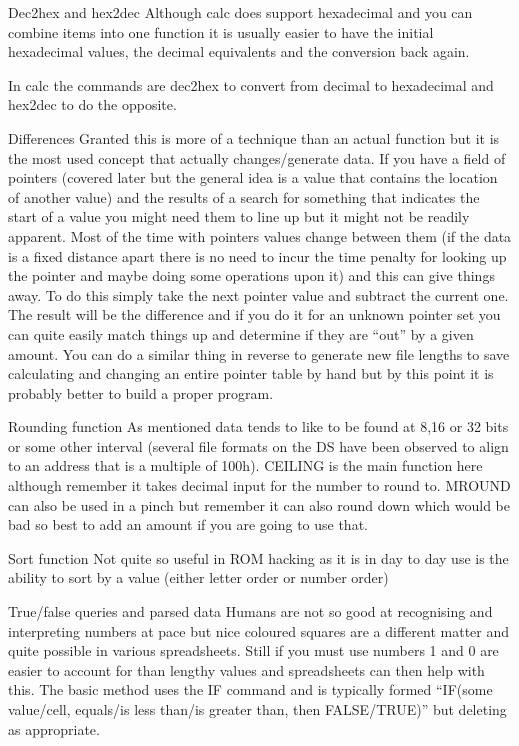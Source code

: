 \documentclass[
]{book}
\begin{document}
Dec2hex and hex2dec Although calc does support hexadecimal and you can combine items into one function it is usually easier to have the initial hexadecimal values, the decimal equivalents and the conversion back again.

In calc the commands are dec2hex to convert from decimal to hexadecimal and hex2dec to do the opposite.

Differences Granted this is more of a technique than an actual function but it is the most used concept that actually changes/generate data. If you have a field of pointers (covered later but the general idea is a value that contains the location of another value) and the results of a search for something that indicates the start of a value you might need them to line up but it might not be readily apparent. Most of the time with pointers values change between them (if the data is a fixed distance apart there is no need to incur the time penalty for looking up the pointer and maybe doing some operations upon it) and this can give things away. To do this simply take the next pointer value and subtract the current one. The result will be the difference and if you do it for an unknown pointer set you can quite easily match things up and determine if they are ``out'' by a given amount. You can do a similar thing in reverse to generate new file lengths to save calculating and changing an entire pointer table by hand but by this point it is probably better to build a proper program.

Rounding function As mentioned data tends to like to be found at 8,16 or 32 bits or some other interval (several file formats on the DS have been observed to align to an address that is a multiple of 100h). CEILING is the main function here although remember it takes decimal input for the number to round to. MROUND can also be used in a pinch but remember it can also round down which would be bad so best to add an amount if you are going to use that.

Sort function Not quite so useful in ROM hacking as it is in day to day use is the ability to sort by a value (either letter order or number order)

True/false queries and parsed data Humans are not so good at recognising and interpreting numbers at pace but nice coloured squares are a different matter and quite possible in various spreadsheets. Still if you must use numbers 1 and 0 are easier to account for than lengthy values and spreadsheets can then help with this. The basic method uses the IF command and is typically formed ``IF(some value/cell, equals/is less than/is greater than, then FALSE/TRUE)'' but deleting as appropriate.
\end{document}
